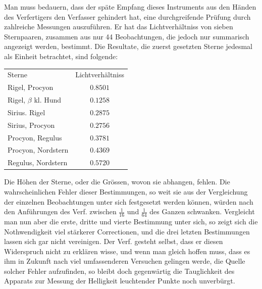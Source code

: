 Man muss bedauern, dass der späte Empfang dieses Instruments aus den Händen des Verfertigers den Verfasser gehindert hat, eine durchgreifende Prüfung durch zahlreiche Messungen auszuführen. Er hat das Lichtverhältniss von sieben Sternpaaren, zusammen aus nur 44 Beobachtungen, die jedoch nur summarisch angezeigt werden, bestimmt. Die Resultate, die zuerst gesetzten Sterne jedesmal als Einheit betrachtet, sind folgende:
\begin{center}
\begin{tabular}{lc}
Sterne & Lichtverhältniss\\[3pt]
Rigel, Procyon & $0.8501$\\
Rigel, $\beta$ kl. Hund & $0.1258$\\
Sirius. Rigel & $0.2875$\\
Sirius, Procyon & $0.2756$\\
Procyon, Regulus & $0.3781$\\
Procyon, Nordstern & $0.4369$\\
Regulus, Nordstern & $0.5720$
\end{tabular}
\end{center}

Die Höhen der Sterne, oder die Grössen, wovon sie abhangen, fehlen. Die wahrscheinlichen Fehler dieser Bestimmungen, so weit sie aus der Vergleichung der einzelnen Beobachtungen unter sich festgesetzt werden können, würden nach den Anführungen des Verf. zwischen $\frac{1}{16}$ und $\frac{1}{64}$ des Ganzen schwanken. Vergleicht man nun aber die erste, dritte und vierte Bestimmung unter sich, so zeigt sich die Nothwendigkeit viel stärkerer Correctionen, und die drei letzten Bestimmungen lassen sich gar nicht vereinigen. Der Verf. gesteht selbst, dass er diesen Widerspruch nicht zu erklären wisse, und wenn man gleich hoffen muss, dass es ihm in Zukunft nach viel umfassenderen Versuchen gelingen werde, die Quelle solcher Fehler aufzufinden, so bleibt doch gegenwärtig die Tauglichkeit des Apparats zur Messung der Helligkeit leuchtender Punkte noch unverbürgt.

